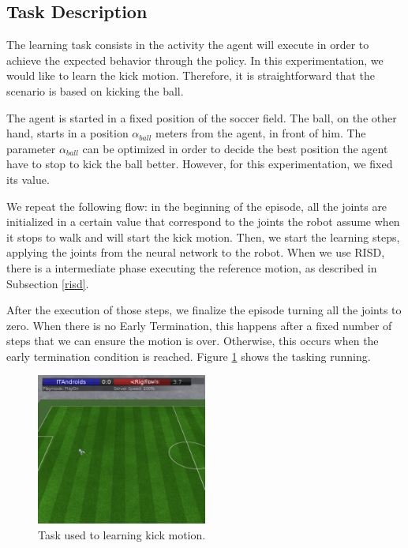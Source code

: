 \subsection{Task Description}
The learning task consists in the activity the agent will execute in order to achieve the expected behavior through the policy. In this experimentation, we would like to learn the kick motion. Therefore, it is straightforward that the scenario is based on kicking the ball.

The agent is started in a fixed position of the soccer field. The ball, on the other hand, starts in a position $\alpha_{ball}$ meters from the agent, in front of him. The parameter $\alpha_{ball}$ can be optimized in order to decide the best position the agent have to stop to kick the ball better. However, for this experimentation, we fixed its value.

We repeat the following flow: in the beginning of the episode, all the joints are initialized in a certain value that correspond to the joints the robot assume when it stops to walk and will start the kick motion. Then, we start the learning steps, applying the joints from the neural network to the robot. When we use RISD, there is a intermediate phase executing the reference motion, as described in Subsection \ref{risd}.

After the execution of those steps, we finalize the episode turning all the joints to zero. When there is no Early Termination, this happens after a fixed number of steps that we can ensure the motion is over. Otherwise, this occurs when the early termination condition is reached. Figure \ref{taskdescription} shows the tasking running.


\begin{figure}[H]
	\centering
	\includegraphics[width=0.5\textwidth]{Cap5/taskdescription.eps}
	\caption{Task used to learning kick motion.}
	\label{taskdescription}
\end{figure}

